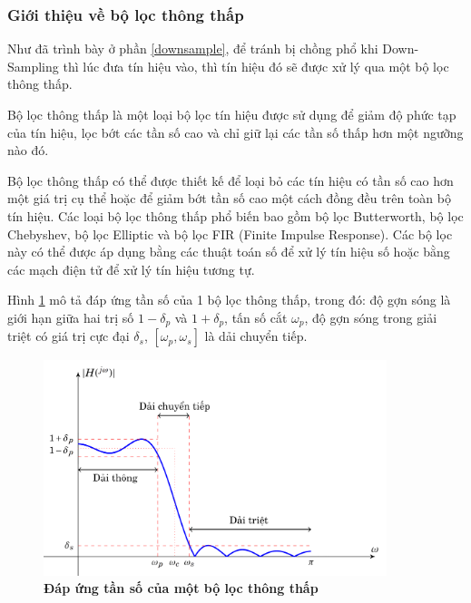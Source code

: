 \subsubsection{Giới thiệu về bộ lọc thông thấp}
Như đã trình bày ở phần \ref{downsample}, để tránh bị chồng phổ khi Down-Sampling thì lúc đưa tín hiệu vào, thì tín hiệu đó sẽ được xử lý qua một bộ lọc thông thấp.

Bộ lọc thông thấp là một loại bộ lọc tín hiệu được sử dụng để giảm độ phức tạp của tín hiệu, lọc bớt các tần số cao và chỉ giữ lại các tần số thấp hơn một ngưỡng nào đó.

Bộ lọc thông thấp có thể được thiết kế để loại bỏ các tín hiệu có tần số cao hơn một giá trị cụ thể hoặc để giảm bớt tần số cao một cách đồng đều trên toàn bộ tín hiệu. Các loại bộ lọc thông thấp phổ biến bao gồm bộ lọc Butterworth, bộ lọc Chebyshev, bộ lọc Elliptic và bộ lọc FIR (Finite Impulse Response). Các bộ lọc này có thể được áp dụng bằng các thuật toán số để xử lý tín hiệu số hoặc bằng các mạch điện tử để xử lý tín hiệu tương tự.

Hình \ref{thongthap_rf} mô tả đáp ứng tần số của 1 bộ lọc thông thấp, trong đó: độ gợn sóng là giới hạn giữa hai trị số $1 - \delta_p$ và $1 + \delta_p$, tấn số cắt $\omega_p$, độ gợn sóng trong giải triệt có giá trị cực đại $\delta_s$, $[\omega_p, \omega_s]$ là dải chuyển tiếp.
\begin{figure}[H]
    \centering
    \includegraphics[width=10cm]{Images/Chuong2/thongthap_rf.png}
    \caption[Đáp ứng tần số của một bộ lọc thông thấp]{\bfseries \fontsize{12pt}{0pt}\selectfont Đáp ứng tần số của một bộ lọc thông thấp}
    \label{thongthap_rf}
\end{figure}

